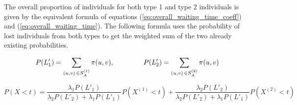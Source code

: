 The overall proportion of individuals for both type 1 and type 2 individuals
is given by the equivalent formula of equations
(\ref{eq:overall_waiting_time_coeff}) and (\ref{eq:overall_waiting_time}).
The following formula uses the probability of lost individuals from both types
to get the weighted sum of the two already existing probabilities.

\begin{equation*}
    P(L'_1) = \sum_{(u,v) \, \in S_A^{(1)}} \pi(u,v), \hspace{1.5cm}
    P(L'_2) = \sum_{(u,v) \, \in S_A^{(2)}} \pi(u,v)
\end{equation*}

\small
\begin{equation}\label{eq:overall_proportion_within_target}
    P(X < t)= \frac{\lambda_1 P(L'_1)}{\lambda_2 P(L'_2)+\lambda_1 P(L'_1)}
    P(X^{(1)} < t) + \frac{\lambda_2 P(L'_2)}{\lambda_2 P(L'_2) + \lambda_1
    P(L'_1)} P(X^{(2)} < t)
\end{equation}
\normalsize